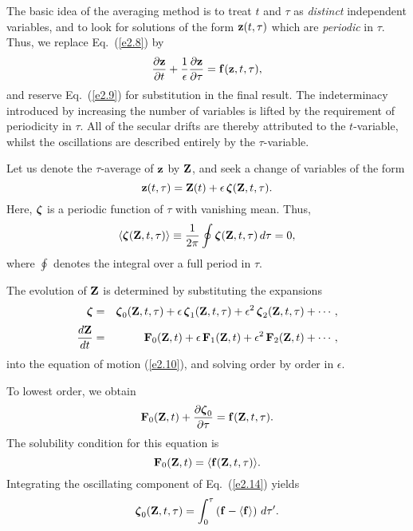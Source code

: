 The basic idea of the averaging method is to treat $t$ and $\tau$ as {\em distinct}\/
independent variables, and to look for solutions of the form ${\bf z}(t,\tau)$
which are {\em periodic}\/ in $\tau$. Thus, we replace Eq.~(\ref{e2.8}) by
\begin{equation}\label{e2.10}
\frac{\partial{\bf z}}{\partial t} +\frac{1}{\epsilon}\frac{\partial {\bf z}}
{\partial \tau} = {\bf f}({\bf z}, t, \tau),
\end{equation}
and reserve Eq.~(\ref{e2.9}) for substitution in the final result. The
indeterminacy introduced by increasing the number of variables is lifted by
the requirement of periodicity in $\tau$. All of the secular drifts
are thereby attributed to the $t$-variable, whilst the oscillations are 
described entirely by the $\tau$-variable. 

Let us denote the $\tau$-average of ${\bf z}$ by ${\bf Z}$, and seek a
change of variables of the form 
\begin{equation}
{\bf z}(t,\tau)  = {\bf Z}(t) +\epsilon\,\mbox{\boldmath$\zeta$}({\bf Z}, t, \tau).
\end{equation}
Here, $\mbox{\boldmath$\zeta$}$ is a periodic function of $\tau$ with vanishing mean.
Thus,
\begin{equation}
\langle \mbox{\boldmath$\zeta$}({\bf Z}, t, \tau)\rangle\equiv
\frac{1}{2\pi}\oint \mbox{\boldmath$\zeta$}({\bf Z}, t, \tau)\,d\tau = 0,
\end{equation}
where $\oint$ denotes the integral over a full period in $\tau$. 

The evolution of ${\bf Z}$ is determined by substituting the
expansions
\begin{eqnarray}
\mbox{\boldmath$\zeta$} &=& \mbox{\boldmath$\zeta$}_0({\bf Z}, t, \tau) + \epsilon\,
\mbox{\boldmath$\zeta$}_1({\bf Z}, t, \tau) + \epsilon^2\,\mbox{\boldmath$\zeta$}_2({\bf Z}, t, \tau) +
\cdots,\\[0.5ex]
\frac{d{\bf Z}}{dt} &=& {\bf F}_0({\bf Z}, t) + \epsilon\,
{\bf F}_1({\bf Z}, t) + \epsilon^2\,{\bf F}_2({\bf Z}, t) +
\cdots,
\end{eqnarray}
into the equation of motion (\ref{e2.10}), and solving order by order in $\epsilon$. 

To lowest order, we obtain
\begin{equation}\label{e2.14}
{\bf F}_0({\bf Z}, t) +\frac{\partial\mbox{\boldmath$\zeta$}_0}{\partial\tau}
= {\bf f} ({\bf Z}, t, \tau).
\end{equation}
The solubility condition for this equation is
\begin{equation}\label{e2.15}
{\bf F}_0({\bf Z}, t) =\langle {\bf f}({\bf Z}, t,\tau)\rangle.
\end{equation}
Integrating the oscillating component of Eq.~(\ref{e2.14}) yields
\begin{equation}
\mbox{\boldmath$\zeta$}_0 ({\bf Z}, t,\tau) = \int_0^\tau\left(
{\bf f} - \langle{\bf f}\rangle\right)\,d\tau'.
\end{equation}

